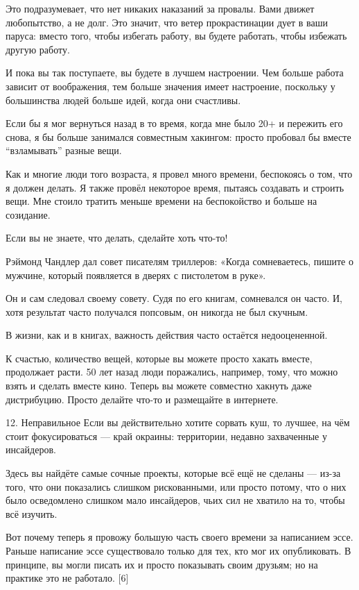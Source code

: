 \documentclass[ebook,12pt,oneside,openany]{memoir}
\begin{document}
Это подразумевает, что нет никаких наказаний за провалы. Вами движет
любопытство, а не долг. Это значит, что ветер прокрастинации дует в
ваши паруса: вместо того, чтобы избегать работу, вы будете работать,
чтобы избежать другую работу.

И пока вы так поступаете, вы будете в лучшем настроении. Чем больше
работа зависит от воображения, тем больше значения имеет настроение,
поскольку у большинства людей больше идей, когда они счастливы.

Если бы я мог вернуться назад в то время, когда мне было 20+ и
пережить его снова, я бы больше занимался совместным хакингом: просто
пробовал бы вместе “взламывать” разные вещи.

Как и многие люди того возраста, я провел много времени, беспокоясь о
том, что я должен делать. Я также провёл некоторое время, пытаясь
создавать и строить вещи. Мне стоило тратить меньше времени на
беспокойство и больше на созидание.

Если вы не знаете, что делать, сделайте хоть что-то!

Рэймонд Чандлер дал совет писателям триллеров: «Когда сомневаетесь,
пишите о мужчине, который появляется в дверях с пистолетом в руке».

Он и сам следовал своему совету. Судя по его книгам, сомневался он
часто. И, хотя результат часто получался попсовым, он никогда не был
скучным.

В жизни, как и в книгах, важность действия часто остаётся
недооцененной.

К счастью, количество вещей, которые вы можете просто хакать вместе,
продолжает расти. 50 лет назад люди поражались, например, тому, что
можно взять и сделать вместе кино. Теперь вы можете совместно хакнуть
даже дистрибуцию. Просто делайте что-то и размещайте в интернете.

12. Неправильное Если вы действительно хотите сорвать куш, то лучшее,
на чём стоит фокусироваться — край окраины: территории, недавно
захваченные у инсайдеров.

Здесь вы найдёте самые сочные проекты, которые всё ещё не сделаны —
из-за того, что они показались слишком рискованными, или просто
потому, что о них было осведомлено слишком мало инсайдеров, чьих сил
не хватило на то, чтобы всё изучить.

Вот почему теперь я провожу большую часть своего времени за написанием
эссе. Раньше написание эссе существовало только для тех, кто мог их
опубликовать. В принципе, вы могли писать их и просто показывать своим
друзьям; но на практике это не работало. [6]
\end{document}
